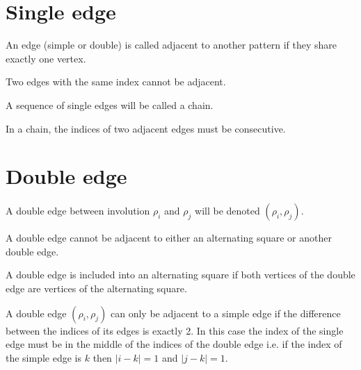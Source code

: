 \section{Single edge}

\begin{definition}
  An edge (simple or double) is called adjacent to another pattern if they share exactly one vertex.
\end{definition}

\begin{proposition}
  Two edges with the same index cannot be adjacent.
\end{proposition}

\begin{definition}
  A sequence of single edges will be called a chain.
\end{definition}

\begin{proposition}
  \label{chain-consecutive}
  In a chain, the indices of two adjacent edges must be consecutive.
\end{proposition}

\section{Double edge}

\begin{notation}
  A double edge between involution $\rho_i$ and $\rho_j$ will be denoted $(\rho_i, \rho_j)$.
\end{notation}

\begin{proposition}
  A double edge cannot be adjacent to either an alternating square or another double edge.
\end{proposition}

\begin{definition}
  A double edge is included into an alternating square if both vertices of the double edge are vertices of the alternating square.
\end{definition}

\begin{proposition}
  \label{adjacent-double}
  A double edge $(\rho_i, \rho_j)$ can only be adjacent to a simple edge if the difference between the indices of its edges is exactly 2. In this case the index of the single edge must be in the middle of the indices of the double edge i.e. if the index of the simple edge is $k$ then $|i-k| = 1$ and $|j-k| = 1$.
\end{proposition}

